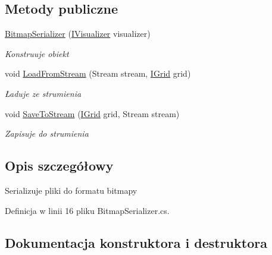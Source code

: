 \subsection*{Metody publiczne}
\begin{DoxyCompactItemize}
\item 
\hyperlink{class_convay_1_1_win_extension_1_1_bitmap_serializer_a9b5358dc3fdc0fe4d436a24f2e158e8a}{Bitmap\+Serializer} (\hyperlink{interface_convay_1_1_win_extension_1_1_i_visualizer}{I\+Visualizer} visualizer)
\begin{DoxyCompactList}\small\item\em Konstruuje obiekt \end{DoxyCompactList}\item 
void \hyperlink{class_convay_1_1_win_extension_1_1_bitmap_serializer_ab92b6c14cd7febe69f9dbc03cb3f2e3b}{Load\+From\+Stream} (Stream stream, \hyperlink{interface_convay_1_1_core_1_1_interfaces_1_1_i_grid}{I\+Grid} grid)
\begin{DoxyCompactList}\small\item\em Ładuje ze strumienia \end{DoxyCompactList}\item 
void \hyperlink{class_convay_1_1_win_extension_1_1_bitmap_serializer_ac5d034f09f4bdeed5230507e3ad8d683}{Save\+To\+Stream} (\hyperlink{interface_convay_1_1_core_1_1_interfaces_1_1_i_grid}{I\+Grid} grid, Stream stream)
\begin{DoxyCompactList}\small\item\em Zapisuje do strumienia \end{DoxyCompactList}\end{DoxyCompactItemize}


\subsection{Opis szczegółowy}
Serializuje pliki do formatu bitmapy 



Definicja w linii 16 pliku Bitmap\+Serializer.\+cs.



\subsection{Dokumentacja konstruktora i destruktora}
\hypertarget{class_convay_1_1_win_extension_1_1_bitmap_serializer_a9b5358dc3fdc0fe4d436a24f2e158e8a}{}\label{class_convay_1_1_win_extension_1_1_bitmap_serializer_a9b5358dc3fdc0fe4d436a24f2e158e8a} 
